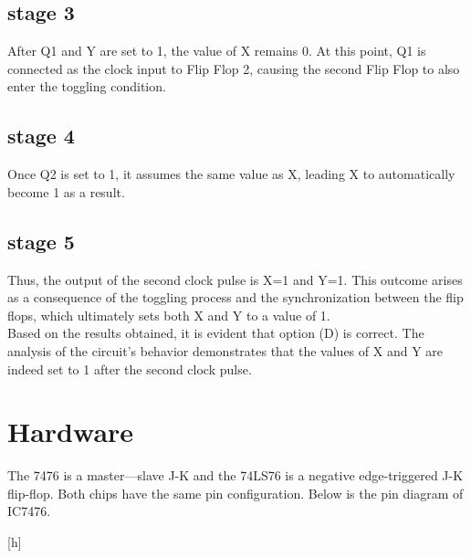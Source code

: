 \documentclass[journal,12pt]{article}
\begin{document}
\subsection{stage 3}
\begin{figure}[h]
	\centering
	
	\caption{}
\end{figure}
After Q1 and Y are set to 1, the value of X remains 0. At this point, Q1 is connected as the clock input to Flip Flop 2, causing the second Flip Flop to also enter the toggling condition.
\pagebreak
\subsection{stage 4}
\begin{figure}[h]
	\centering
	
	\caption{}
\end{figure}
Once Q2 is set to 1, it assumes the same value as X, leading X to automatically become 1 as a result.
\subsection{stage 5}
\begin{figure}[h]
	\centering
	
	\caption{}
\end{figure}
Thus, the output of the second clock pulse is X=1 and Y=1. This outcome arises as a consequence of the toggling process and the synchronization between the flip flops, which ultimately sets both X and Y to a value of 1.\\
Based on the results obtained, it is evident that option (D) is correct. The analysis of the circuit's behavior demonstrates that the values of X and Y are indeed set to 1 after the second clock pulse.
\pagebreak

\section{Hardware}
The 7476 is a master—slave J-K and the 74LS76 is a negative edge-triggered J-K flip-flop. Both chips have the same pin configuration. Below is the pin diagram of IC7476. \\
\begin{center}[h]
	\centering
	
	\label{pindiagram.}
\end{center}
\end{document}
